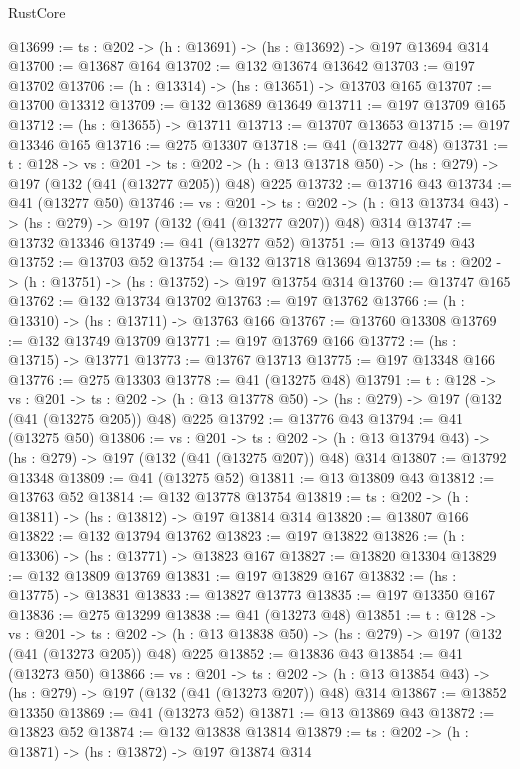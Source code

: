 \begin{lexlean}{RustCore}
\begin{coremodule}
@13699 := {ts : @202} -> (h : @13691) -> (hs : @13692) -> @197 @13694 @314
@13700 := @13687 @164
@13702 := @132 @13674 @13642
@13703 := @197 @13702
@13706 := (h : @13314) -> (hs : @13651) -> @13703 @165
@13707 := @13700 @13312
@13709 := @132 @13689 @13649
@13711 := @197 @13709 @165
@13712 := (hs : @13655) -> @13711
@13713 := @13707 @13653
@13715 := @197 @13346 @165
@13716 := @275 @13307
@13718 := @41 (@13277 @48)
@13731 := {t : @128} ->
  {vs : @201} ->
  {ts : @202} -> (h : @13 @13718 @50) -> (hs : @279) -> @197 (@132 (@41 (@13277 @205)) @48) @225
@13732 := @13716 @43
@13734 := @41 (@13277 @50)
@13746 := {vs : @201} ->
  {ts : @202} -> (h : @13 @13734 @43) -> (hs : @279) -> @197 (@132 (@41 (@13277 @207)) @48) @314
@13747 := @13732 @13346
@13749 := @41 (@13277 @52)
@13751 := @13 @13749 @43
@13752 := @13703 @52
@13754 := @132 @13718 @13694
@13759 := {ts : @202} -> (h : @13751) -> (hs : @13752) -> @197 @13754 @314
@13760 := @13747 @165
@13762 := @132 @13734 @13702
@13763 := @197 @13762
@13766 := (h : @13310) -> (hs : @13711) -> @13763 @166
@13767 := @13760 @13308
@13769 := @132 @13749 @13709
@13771 := @197 @13769 @166
@13772 := (hs : @13715) -> @13771
@13773 := @13767 @13713
@13775 := @197 @13348 @166
@13776 := @275 @13303
@13778 := @41 (@13275 @48)
@13791 := {t : @128} ->
  {vs : @201} ->
  {ts : @202} -> (h : @13 @13778 @50) -> (hs : @279) -> @197 (@132 (@41 (@13275 @205)) @48) @225
@13792 := @13776 @43
@13794 := @41 (@13275 @50)
@13806 := {vs : @201} ->
  {ts : @202} -> (h : @13 @13794 @43) -> (hs : @279) -> @197 (@132 (@41 (@13275 @207)) @48) @314
@13807 := @13792 @13348
@13809 := @41 (@13275 @52)
@13811 := @13 @13809 @43
@13812 := @13763 @52
@13814 := @132 @13778 @13754
@13819 := {ts : @202} -> (h : @13811) -> (hs : @13812) -> @197 @13814 @314
@13820 := @13807 @166
@13822 := @132 @13794 @13762
@13823 := @197 @13822
@13826 := (h : @13306) -> (hs : @13771) -> @13823 @167
@13827 := @13820 @13304
@13829 := @132 @13809 @13769
@13831 := @197 @13829 @167
@13832 := (hs : @13775) -> @13831
@13833 := @13827 @13773
@13835 := @197 @13350 @167
@13836 := @275 @13299
@13838 := @41 (@13273 @48)
@13851 := {t : @128} ->
  {vs : @201} ->
  {ts : @202} -> (h : @13 @13838 @50) -> (hs : @279) -> @197 (@132 (@41 (@13273 @205)) @48) @225
@13852 := @13836 @43
@13854 := @41 (@13273 @50)
@13866 := {vs : @201} ->
  {ts : @202} -> (h : @13 @13854 @43) -> (hs : @279) -> @197 (@132 (@41 (@13273 @207)) @48) @314
@13867 := @13852 @13350
@13869 := @41 (@13273 @52)
@13871 := @13 @13869 @43
@13872 := @13823 @52
@13874 := @132 @13838 @13814
@13879 := {ts : @202} -> (h : @13871) -> (hs : @13872) -> @197 @13874 @314

\end{coremodule}
\end{lexlean}
